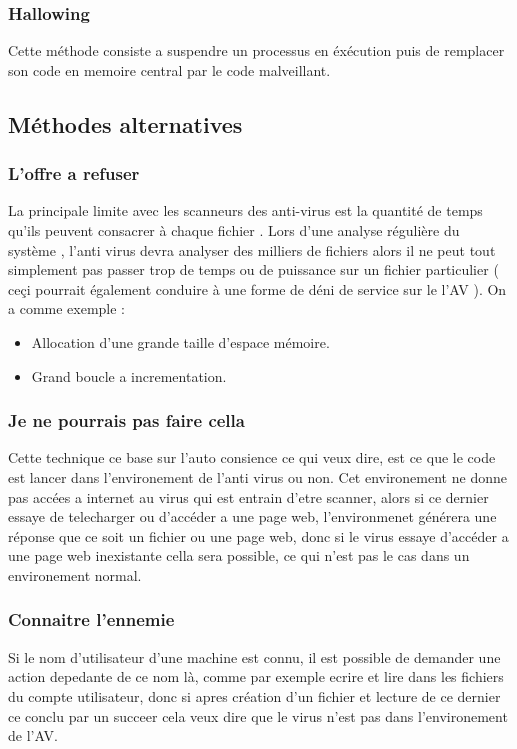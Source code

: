         \subsubsection{Hallowing} Cette méthode consiste a suspendre un processus en éxécution puis de remplacer son code en memoire central par le code malveillant.

    \subsection{Méthodes alternatives}
        \subsubsection{L'offre a refuser} La principale limite avec les scanneurs des anti-virus est la quantité de temps qu'ils peuvent consacrer à chaque fichier . Lors d'une analyse régulière du système , l'anti virus devra analyser des milliers de fichiers alors il ne peut tout simplement pas passer trop de temps ou de puissance sur un fichier particulier ( ceçi pourrait également conduire à une forme de déni de service sur le l'AV ). On a comme exemple :
        \begin{itemize}
            \item Allocation d'une grande taille d'espace mémoire.
            \item Grand boucle a incrementation.
        \end{itemize}

        \subsubsection{Je ne pourrais pas faire cella} Cette technique ce base sur l'auto consience ce qui veux dire, est ce que le code est lancer dans l'environement de l'anti virus ou non.
            Cet environement ne donne pas accées a internet au virus qui est entrain d'etre scanner, alors si ce dernier essaye de telecharger ou d'accéder a une page web, l'environmenet générera une réponse que ce soit un fichier ou une page web,
            donc si le virus essaye d'accéder a une page web inexistante cella sera possible, ce qui n'est pas le cas dans un environement normal.

        \subsubsection{Connaitre l'ennemie} Si le nom d'utilisateur d'une machine est connu, il est possible de demander une action depedante de ce nom là, comme par exemple ecrire et lire dans les fichiers du compte utilisateur, donc si apres création d'un fichier et lecture de ce dernier ce conclu par un succeer cela veux dire que le virus n'est pas dans l'environement de l'AV.

